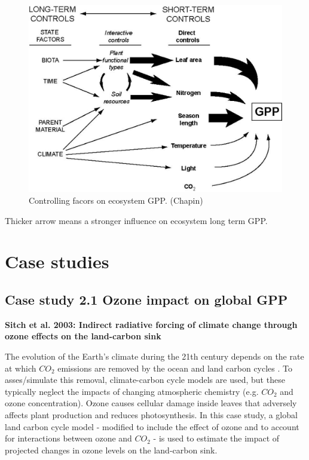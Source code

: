 \documentclass[12pt,oneside]{book}
\begin{document}
\begin{figure}

{\centering \includegraphics[width=0.8\linewidth]{figures/chap2/GPPcontrols} 

}

\caption{Controlling facors on ecosystem GPP. (Chapin)}\label{fig:f222}
\end{figure}

Thicker arrow means a stronger influence on ecosystem long term GPP.

\section{Case studies}\label{case-studies}

\subsection{Case study 2.1 Ozone impact on global
GPP}\label{case-study-2.1-ozone-impact-on-global-gpp}

\textbf{Sitch et al. 2003: Indirect radiative forcing of climate change
through ozone effects on the land-carbon sink}

The evolution of the Earth's climate during the 21th century depends on
the rate at which \(CO_2\) emissions are removed by the ocean and land
carbon cycles . To asses/simulate this removal, climate-carbon cycle
models are used, but these typically neglect the impacts of changing
atmospheric chemistry (e.g. \(CO_2\) and ozone concentration). Ozone
causes cellular damage inside leaves that adversely affects plant
production and reduces photosynthesis. In this case study, a global land
carbon cycle model - modified to include the effect of ozone and to
account for interactions between ozone and \(CO_2\) - is used to
estimate the impact of projected changes in ozone levels on the
land-carbon sink.
\end{document}
